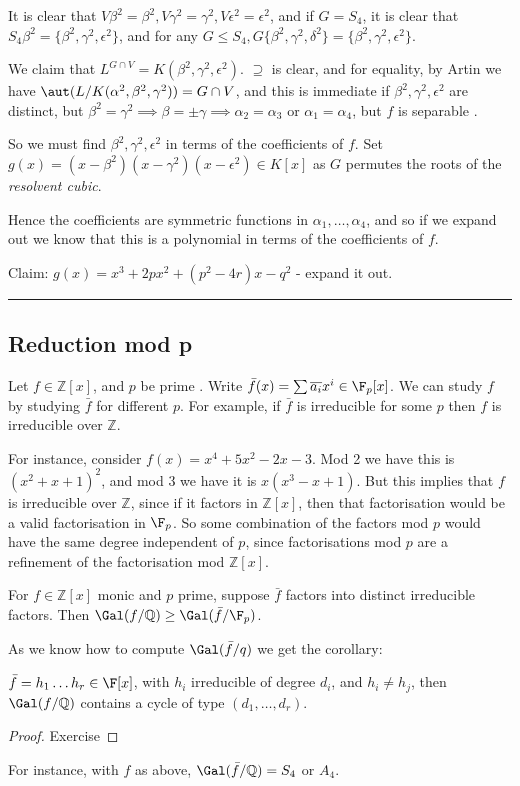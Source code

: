 \documentclass[a4paper, 10pt, twocolumn]{amsart}
\begin{document}
It is clear that $V\beta^2 = \beta^2, V\gamma^2=\gamma^2, V \epsilon^2 = \epsilon^2$, and if $G = S_4$, it is clear that $S_4 \beta^2 = \{\beta^2, \gamma^2, \epsilon^2\}$, and for any $G \leq S_4, G \{\beta^2, \gamma^2, \delta^2\} = \{\beta^2, \gamma^2, \epsilon^2\}$.

We claim that $L^{G \cap V} = K(\beta^2, \gamma^2, \epsilon^2)$. $\supseteq$ is clear, and for equality, by Artin we have $\aut(L/K(\alpha^2, \beta^2, \gamma^2)) = G \cap V$, and this is immediate if $\beta^2, \gamma^2, \epsilon^2$ are distinct, but $\beta^2 = \gamma^2 \implies \beta =\pm \gamma \implies \alpha_2=\alpha_3$ or $\alpha_1=\alpha_4$, but $f$ is separable \contr.

So we must find $\beta^2, \gamma^2, \epsilon^2$ in terms of the coefficients of $f$. Set $g(x) = (x-\beta^2)(x-\gamma^2)(x-\epsilon^2) \in K[x]$ as $G$ permutes the roots of the \emph{resolvent cubic}.

Hence the coefficients are symmetric functions in $\alpha_1, \ldots, \alpha_4$, and so if we expand out we know that this is a polynomial in terms of the coefficients of $f$.

Claim: $g(x) = x^3 + 2px^2 + (p^2-4r)x - q^2$ - expand it out. 
\hrule

\subsection*{Reduction mod p}
Let $f \in \mathbb{Z}[x]$, and $p$ be prime . Write $\bar{f}(x) = \sum \overline{a_i} x^i \in \F_p[x]$. We can study $f$ by studying $\bar{f}$ for different $p$. For example, if $\bar{f}$ is irreducible for some $p$ then $f$ is irreducible over $\mathbb{Z}$.

For instance, consider $f(x) = x^4+5x^2-2x-3$. Mod 2 we have this is $(x^2+x+1)^2$, and mod 3 we have it is $x(x^3-x+1)$. But this implies that $f$ is irreducible over $\mathbb{Z}$, since if it factors in $\mathbb{Z}[x]$, then that factorisation would be a valid factorisation in $\F_p$. So some combination of the factors mod $p$ would have the same degree independent of $p$, since factorisations mod $p$ are a refinement of the factorisation mod $\mathbb{Z}[x]$.

\begin{theorem}[Dedekind]
For $f \in \mathbb{Z}[x]$ monic and $p$ prime, suppose $\bar{f}$ factors into distinct irreducible factors. Then $\Gal(f/\mathbb{Q}) \geq \Gal(\bar{f}/\F_p)$.
\end{theorem}
As we know how to compute $\Gal(\bar{f}/q)$ we get the corollary:
\begin{corollary}
$\bar{f} = h_1\ldots h_r \in \F[x]$, with $h_i$ irreducible of degree $d_i$, and $h_i \neq h_j$, then $\Gal(f/\mathbb{Q})$ contains a cycle of type $(d_1, \ldots, d_r)$.
\end{corollary}
\begin{proof}
Exercise
\end{proof}
For instance, with $f$ as above, $\Gal(\bar{f}/\mathbb{Q}) = S_4$ or $A_4$.
\end{document}

